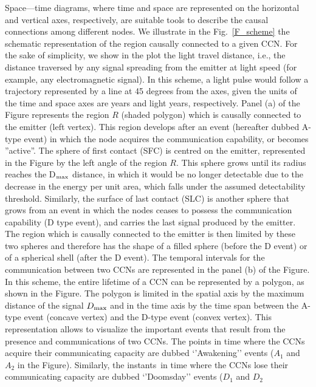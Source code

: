 \documentclass[crop]{CSLB}
\newcommand{\ceti}{CCN}
\newcommand{\cetis}{CCNs}
\newcommand{\ffn}[1]{}
\begin{document}
\ffn{1} Space—time diagrams, where time and space are represented on
the horizontal and vertical axes, respectively, are suitable tools to
describe the causal connections among different nodes.
%
We illustrate in the Fig.~\ref{F_scheme} the schematic representation
of the region causally connected to a given \ceti{}.
%
For the sake of simplicity, we show in the plot the light travel
distance, i.e., the distance traversed by any signal spreading from
the emitter at light speed (for example, any electromagnetic signal).
%
In this scheme, a light pulse would follow a trajectory represented by
a line at 45 degrees from the axes, given the units of the time and
space axes are years and light years, respectively.
%
Panel (a) of the Figure represents the region $R$ (shaded polygon)
which is causally connected to the emitter (left vertex).
%
This region develops after an event (hereafter dubbed A-type event) in
which the node acquires the communication capability, or becomes
''active''.
%
The sphere of first contact (SFC) is centred on the emitter,
represented in the Figure by the left angle of the region $R$.
%
This sphere grows until its radius reaches the D$_{\rm max}$ distance, in
which it would be no longer detectable due to the decrease in the
energy per unit area, which falls under the assumed detectability
threshold.
%
Similarly, the surface of last contact (SLC) is another sphere that
grows from an event in which the nodes ceases to possess the
communication capability (D type event), and carries the last signal
produced by the emitter.
%
The region which is causally connected to the emitter is then limited
by these two spheres and therefore has the shape of a filled sphere
(before the D event) or of a spherical shell (after the D event).
%
The temporal intervals for the communication between two \cetis{} are
represented in the panel (b) of the Figure.
%
In this scheme, the entire lifetime of a \ceti{} can be represented by
a polygon, as shown in the Figure.
%
The polygon is limited in the spatial axis by the maximum distance of
the signal $D_{\rm max}$ and in the time axis by the time span between the
A-type event (concave vertex) and the D-type event (convex vertex).
%
This representation allows to visualize the important events that
result from the presence and communications of two \cetis{}.
%
The points in time where the \cetis{} acquire their communicating
capacity are dubbed ‘’Awakening’’ events ($A_1$ and $A_2$ in the
Figure).
%
Similarly, the instants in time where the \cetis{} lose their
communicating capacity are dubbed ‘’Doomsday’’ events ($D_1$ and $D_2$
\end{document}
